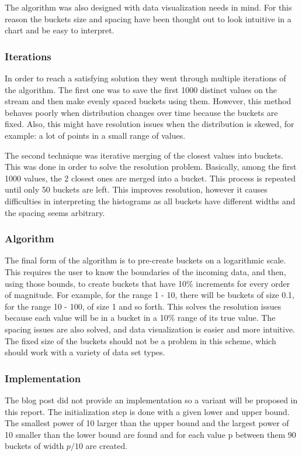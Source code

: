 \documentclass[12pt]{article}
\begin{document}
	The algorithm was also designed with data visualization needs in mind. 
	For this reason the buckets size and spacing have been thought out to 
	look intuitive in a chart and be easy to interpret.

	\subsubsection{Iterations}
	In order to reach a satisfying solution they went through multiple iterations 
	of the algorithm. The first one was to save the first 1000 distinct values 
	on the stream and then make evenly spaced buckets using them. However, this 
	method behaves poorly when distribution changes over time because the buckets 
	are fixed. Also, this might have resolution issues when the distribution 
	is skewed, for example: a lot of points in a small range of values. 
	
	The second technique was iterative merging of the closest values into buckets. 
	This was done in order to solve the resolution problem. Basically, among the 
	first 1000 values, the 2 closest ones are merged into a bucket. This process 
	is repeated until only 50 buckets are left. This improves resolution, however 
	it causes difficulties in interpreting the histograms as all buckets have 
	different widths and the spacing seems arbitrary. 

	\subsubsection{Algorithm}
	The final form of the algorithm is to pre-create buckets on a logarithmic 
	scale. This requires the user to know the boundaries of the incoming data, 
	and then, using those bounds, to create buckets that have 10\% increments 
	for every order of magnitude. For example, for the range 1 - 10, there will be 
	buckets of size 0.1, for the range 10 - 100, of size 1 and so forth. This solves
	the resolution issues because each value will be in a bucket in a 10\% range 
	of its true value. The spacing issues are also solved, and data visualization
	is easier and more intuitive. The fixed size of the buckets should not be a 
	problem in this scheme, which should work with a variety of data set types.

	\subsubsection{Implementation}
	The blog post did not provide an implementation so a variant will be 
	proposed in this report. The initialization step is done with a given 
	lower and upper bound. The smallest power of 10 larger than the upper bound 
	and the largest power of 10 smaller than the lower bound are found and 
	for each value p between them 90 buckets of width $p / 10$ are created.
\end{document}
